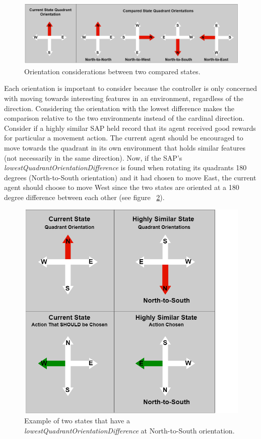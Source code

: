 \begin{figure}[H]
  \includegraphics[width=1.0\columnwidth]{Figures/quadrant_orientations.png}
  \caption{Orientation considerations between two compared states.}
  \label{fig:quadrant_orientations}
\end{figure}

Each orientation is important to consider because the controller is only concerned with moving towards interesting features in an environment, regardless of the direction.
Considering the orientation with the lowest difference makes the comparison relative to the two environments instead of the cardinal direction.
Consider if a highly similar SAP held record that its agent received good rewards for particular a movement action.
The current agent should be encouraged to move towards the quadrant in its own environment that holds similar features (not necessarily in the same direction).
Now, if the SAP's \textit{lowestQuadrantOrientationDifference} is found when rotating its quadrants 180 degrees (North-to-South orientation) and it had chosen to move East, the current agent should choose to move West since the two states are oriented at a 180 degree difference between each other (see figure ~\ref{fig:oriented_movement_example}).

\begin{figure}[H]
  \includegraphics[width=1.0\columnwidth]{Figures/oriented_movement_example.png}
  \caption{Example of two states that have a \textit{lowestQuadrantOrientationDifference} at North-to-South orientation.}
  \label{fig:oriented_movement_example}
\end{figure}

